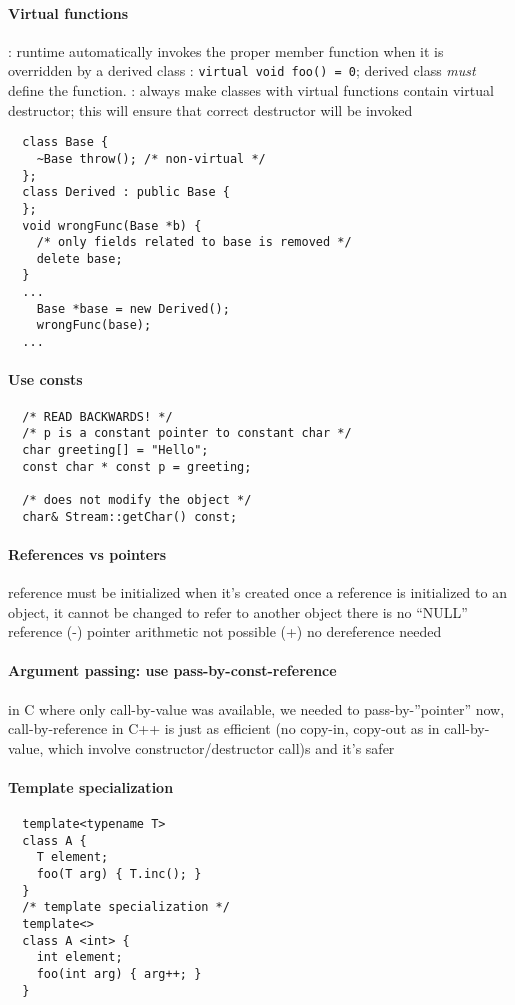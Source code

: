 \documentclass{memo}
\begin{document}
\paragraph{Virtual functions}
\bit
\w {}: runtime automatically invokes the proper
member function when it is overridden by a derived class
\w {}: \verb+virtual void foo() = 0+; derived class
   {\em must\/} define the function.
\w {}: always make classes with virtual functions contain
virtual destructor; this will ensure that correct destructor will be invoked
  \begin{verbatim}
  class Base { 
    ~Base throw(); /* non-virtual */
  };
  class Derived : public Base {
  };
  void wrongFunc(Base *b) {
    /* only fields related to base is removed */
    delete base;
  }
  ...
    Base *base = new Derived();
    wrongFunc(base);
  ...
  \end{verbatim}
\eit

\paragraph{Use consts}
\begin{verbatim}
  /* READ BACKWARDS! */
  /* p is a constant pointer to constant char */
  char greeting[] = "Hello";
  const char * const p = greeting;

  /* does not modify the object */
  char& Stream::getChar() const;
\end{verbatim}

\paragraph{References vs pointers}
\bit
\w reference must be initialized when it's created
\w once a reference is initialized to an object, it cannot be changed to
refer to another object
\w there is no ``NULL'' reference
\w (-) pointer arithmetic not possible
\w (+) no dereference needed
\eit

\paragraph{Argument passing: use pass-by-const-reference}
\bit
\w in C where only call-by-value was available, we needed to
pass-by-''pointer'' 
\w now, call-by-reference in C++ is just as efficient (no copy-in, copy-out as
in call-by-value, which involve constructor/destructor call)s and it's safer
\eit

\paragraph{Template specialization}
  \begin{verbatim}
  template<typename T>
  class A {
    T element;
    foo(T arg) { T.inc(); }
  }
  /* template specialization */
  template<>
  class A <int> {
    int element;
    foo(int arg) { arg++; }
  }
  \end{verbatim}
\end{document}
